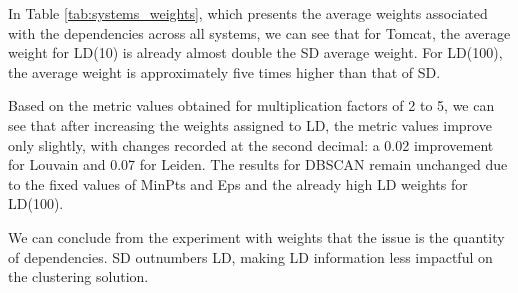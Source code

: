 \documentclass[12pt, a4paper, twoside]{report}
\begin{document}
\begin{table}[htbp]
\centering
\caption{Impact of multiplication factors on clustering results for LD(100) in Apache Tomcat}
\label{tab:clustering_results_multiplication}
\end{table}


In Table \ref{tab:systems_weights}, which presents the average weights associated with the dependencies across all systems, we can see that for Tomcat, the average weight for LD(10) is already almost double the SD average weight. For LD(100), the average weight is approximately five times higher than that of SD.

Based on the metric values obtained for multiplication factors of 2 to 5, we can see that after increasing the weights assigned to LD, the metric values improve only slightly, with changes recorded at the second decimal: a 0.02 improvement for Louvain and 0.07 for Leiden. The results for DBSCAN remain unchanged due to the fixed values of MinPts and Eps and the already high LD weights for LD(100).

We can conclude from the experiment with weights that the issue is the quantity of dependencies. SD outnumbers LD, making LD information less impactful on the clustering solution.
\end{document}
